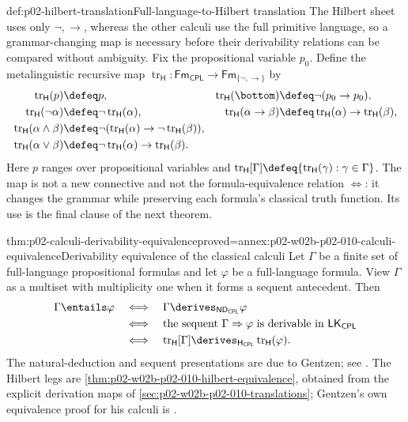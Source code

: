 \begin{hbdefinition}{def:p02-hilbert-translation}{Full-language-to-Hilbert translation}
The Hilbert sheet uses only \(\neg,\to\), whereas the other calculi use the
full primitive language, so a grammar-changing map is necessary before their
derivability relations can be compared without ambiguity.  Fix the
propositional variable \(p_0\).  Define the metalinguistic recursive map
\(\operatorname{tr}_{\mathsf H}:\mathsf{Fm}_{\mathsf{CPL}}\to
\mathsf{Fm}_{\{\neg,\to\}}\) by
\[
\begin{aligned}
 \operatorname{tr}_{\mathsf H}(p)&\defeq p,
 &\operatorname{tr}_{\mathsf H}(\bottom)&\defeq\neg(p_0\to p_0),
 \\
 \operatorname{tr}_{\mathsf H}(\neg\alpha)&\defeq
   \neg\operatorname{tr}_{\mathsf H}(\alpha),
 &\operatorname{tr}_{\mathsf H}(\alpha\to\beta)&\defeq
   \operatorname{tr}_{\mathsf H}(\alpha)\to
   \operatorname{tr}_{\mathsf H}(\beta),
 \\
 \operatorname{tr}_{\mathsf H}(\alpha\land\beta)&\defeq
   \neg(\operatorname{tr}_{\mathsf H}(\alpha)\to
        \neg\operatorname{tr}_{\mathsf H}(\beta)),
 \\
 \operatorname{tr}_{\mathsf H}(\alpha\lor\beta)&\defeq
   \neg\operatorname{tr}_{\mathsf H}(\alpha)\to
        \operatorname{tr}_{\mathsf H}(\beta).
\end{aligned}
\]
Here \(p\) ranges over propositional variables and
\(\operatorname{tr}_{\mathsf H}[\Gamma]\defeq
\{\operatorname{tr}_{\mathsf H}(\gamma):\gamma\in\Gamma\}\).  The map is not a
new connective and not the formula-equivalence relation \(\Leftrightarrow\):
it changes the grammar while preserving each formula's classical truth
function.  Its use is the final clause of the next theorem.
\end{hbdefinition}

\begin{hbtheorem}{thm:p02-calculi-derivability-equivalence}{proved=annex:p02-w02b-p02-010-calculi-equivalence}{Derivability equivalence of the classical calculi}
Let \(\Gamma\) be a finite set of full-language propositional formulas and
let \(\varphi\) be a full-language formula.  View \(\Gamma\) as a multiset
with multiplicity one when it forms a sequent antecedent.  Then
\[
\begin{aligned}
 \Gamma\entails\varphi
 &\quad\Longleftrightarrow\quad
 \Gamma\derives_{\mathsf{ND}_{\mathsf{CPL}}}\varphi\\
 &\quad\Longleftrightarrow\quad
 \text{the sequent }\Gamma\Rightarrow\varphi
   \text{ is derivable in }\mathsf{LK}_{\mathsf{CPL}}\\
 &\quad\Longleftrightarrow\quad
 \operatorname{tr}_{\mathsf H}[\Gamma]
   \derives_{\mathsf H_{\mathsf{CPL}}}
   \operatorname{tr}_{\mathsf H}(\varphi).
\end{aligned}
\]
The natural-deduction and sequent presentations are due to Gentzen; see
\cite{Gentzen1934a}.  The Hilbert legs are
\cref{thm:p02-w02b-p02-010-hilbert-equivalence}, obtained from the explicit
derivation maps of \cref{sec:p02-w02b-p02-010-translations}; Gentzen's own
equivalence proof for his calculi is \cite[Abschnitt~V, \S 6, p.~429]{Gentzen1935b}.
\end{hbtheorem}

